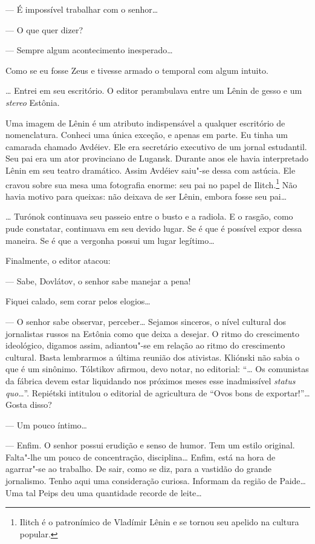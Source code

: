 --- É impossível trabalhar com o senhor\ldots{}

--- O que quer dizer?

--- Sempre algum acontecimento inesperado\ldots{}

Como se eu fosse Zeus e tivesse armado o temporal com algum intuito.

\ldots{} Entrei em seu escritório. O editor perambulava entre um Lênin de
gesso e um \emph{stereo} Estônia.

Uma imagem de Lênin é um atributo indispensável a qualquer escritório de
nomenclatura. Conheci uma única exceção, e apenas em parte. Eu tinha um
camarada chamado Avdéiev. Ele era secretário executivo de um jornal
estudantil. Seu pai era um ator provinciano de Lugansk. Durante anos ele
havia interpretado Lênin em seu teatro dramático. Assim Avdéiev saiu"-se
dessa com astúcia. Ele cravou sobre sua mesa uma fotografia enorme: seu
pai no papel de Ilitch.\footnote{Ilitch é o patronímico de Vladímir
  Lênin e se tornou seu apelido na cultura popular.} Não havia motivo
para queixas: não deixava de ser Lênin, embora fosse seu pai\ldots{}

\ldots{} Turónok continuava seu passeio entre o busto e a radiola. E o
rasgão, como pude constatar, continuava em seu devido lugar. Se é que é
possível expor dessa maneira. Se é que a vergonha possui um lugar
legítimo\ldots{}

Finalmente, o editor atacou:

--- Sabe, Dovlátov, o senhor sabe manejar a pena!

Fiquei calado, sem corar pelos elogios\ldots{}

--- O senhor sabe observar, perceber\ldots{} Sejamos sinceros, o nível
cultural dos jornalistas russos na Estônia como que deixa a desejar. O
ritmo do crescimento ideológico, digamos assim, adiantou"-se em relação
ao ritmo do crescimento cultural. Basta lembrarmos a última reunião dos
ativistas. Kliónski não sabia o que é um sinônimo. Tólstikov afirmou,
devo notar, no editorial: ``\ldots{} Os comunistas da fábrica devem estar
liquidando nos próximos meses esse inadmissível \emph{status quo}\ldots{}''.
Repiétski intitulou o editorial de agricultura de ``Ovos bons de
exportar!''\ldots{} Gosta disso?

--- Um pouco íntimo\ldots{}

--- Enfim. O senhor possui erudição e senso de humor. Tem um
estilo original. Falta"-lhe um pouco de concentração, disciplina\ldots{}
Enfim, está na hora de agarrar"-se ao trabalho. De sair, como se diz,
para a vastidão do grande jornalismo. Tenho aqui uma consideração
curiosa. Informam da região de Paide\ldots{} Uma tal Peips deu uma quantidade
recorde de leite\ldots{}

